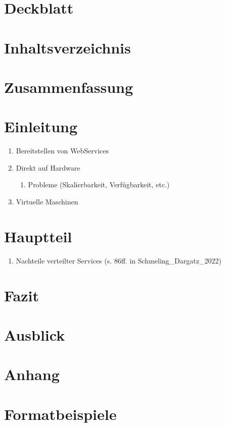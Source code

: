 \documentclass[11pt,a4paper]{article}
\begin{document}
\section{Deckblatt}
\section{Inhaltsverzeichnis}



\section{Zusammenfassung}

\section{Einleitung}

\begin{enumerate}
	\item Bereitstellen von WebServices
	\item Direkt auf Hardware
	\begin{enumerate}
		\item Probleme (Skalierbarkeit, Verfügbarkeit, etc.)
	\end{enumerate}
	\item Virtuelle Maschinen
\end{enumerate}

\section{Hauptteil}
\begin{enumerate}
	\item Nachteile verteilter Services (s. 86ff. in Schmeling_Dargatz_2022)
\end{enumerate}

\section{Fazit}

\section{Ausblick}

\section{Anhang}


\section{Formatbeispiele}
\end{document}
